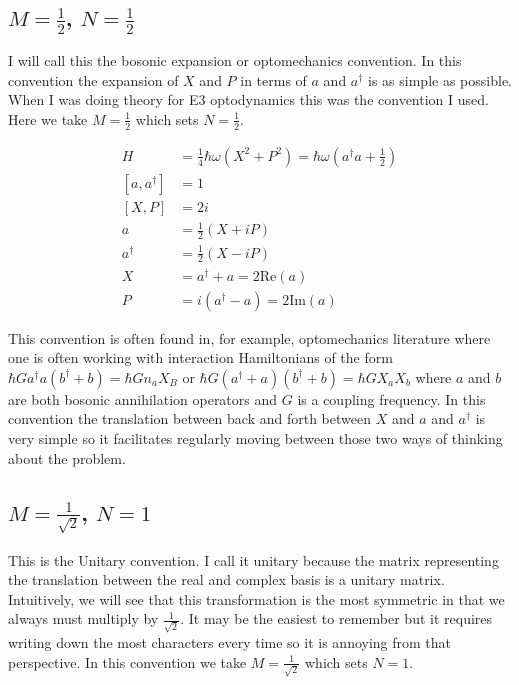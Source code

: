 \documentclass[12pt]{article}
\begin{document}
\subsection{$M=\frac{1}{2}$, $N=\frac{1}{2}$}

I will call this the bosonic expansion or optomechanics convention. In this convention the expansion of $X$ and $P$ in terms of $a$ and $a^{\dag}$ is as simple as possible. When I was doing theory for E3 optodynamics this was the convention I used. Here we take $M=\frac{1}{2}$ which sets $N=\frac{1}{2}$.

\begin{align}
H &= \frac{1}{4}\hbar \omega (X^2 + P^2) = \hbar \omega \left(a^{\dag}a+\frac{1}{2}\right)\\
[a, a^{\dag}] &= 1\\
[X,P] &= 2i\\
a &= \frac{1}{2}(X + i P)\\
a^{\dag} &= \frac{1}{2}(X - i P)\\
X &= a^{\dag} + a = 2\text{Re}(a)\\
P &= i(a^{\dag} - a) = 2\text{Im}(a)
\end{align}

This convention is often found in, for example, optomechanics literature where one is often working with interaction Hamiltonians of the form $\hbar G a^{\dag}a(b^{\dag} + b) = \hbar G n_a X_B$ or $\hbar G(a^{\dag} + a)(b^{\dag} + b) = \hbar G X_a X_b$ where $a$ and $b$ are both bosonic annihilation operators and $G$ is a coupling frequency. In this convention the translation between back and forth between $X$ and $a$ and $a^{\dag}$ is very simple so it facilitates regularly moving between those two ways of thinking about the problem.

\subsection{$M = \frac{1}{\sqrt{2}}$, $N=1$}

This is the Unitary convention. I call it unitary because the matrix representing the translation between the real and complex basis is a unitary matrix. Intuitively, we will see that this transformation is the most symmetric in that we always must multiply by $\frac{1}{\sqrt{2}}$. It may be the easiest to remember but it requires writing down the most characters every time so it is annoying from that perspective. In this convention we take $M=\frac{1}{\sqrt{2}}$ which sets $N=1$.
\end{document}

